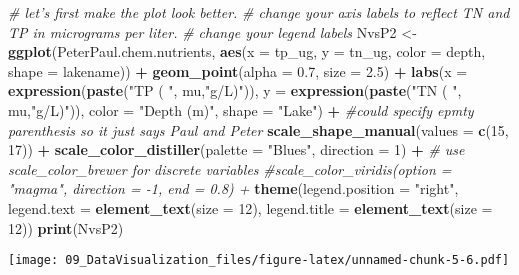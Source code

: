 \documentclass[]{article}
\newenvironment{Shaded}{\begin{snugshade}}{\end{snugshade}}
\newcommand{\KeywordTok}[1]{\textcolor[rgb]{0.13,0.29,0.53}{\textbf{#1}}}
\newcommand{\DataTypeTok}[1]{\textcolor[rgb]{0.13,0.29,0.53}{#1}}
\newcommand{\DecValTok}[1]{\textcolor[rgb]{0.00,0.00,0.81}{#1}}
\newcommand{\FloatTok}[1]{\textcolor[rgb]{0.00,0.00,0.81}{#1}}
\newcommand{\StringTok}[1]{\textcolor[rgb]{0.31,0.60,0.02}{#1}}
\newcommand{\CommentTok}[1]{\textcolor[rgb]{0.56,0.35,0.01}{\textit{#1}}}
\newcommand{\OperatorTok}[1]{\textcolor[rgb]{0.81,0.36,0.00}{\textbf{#1}}}
\newcommand{\NormalTok}[1]{#1}
\begin{document}
\begin{Shaded}
\begin{Highlighting}[]
\CommentTok{# let's first make the plot look better.}
\CommentTok{# change your axis labels to reflect TN and TP in micrograms per liter.}
\CommentTok{# change your legend labels}
\NormalTok{NvsP2 <-}
\StringTok{  }\KeywordTok{ggplot}\NormalTok{(PeterPaul.chem.nutrients, }\KeywordTok{aes}\NormalTok{(}\DataTypeTok{x =}\NormalTok{ tp_ug, }\DataTypeTok{y =}\NormalTok{ tn_ug, }\DataTypeTok{color =}\NormalTok{ depth, }\DataTypeTok{shape =}\NormalTok{ lakename)) }\OperatorTok{+}
\StringTok{  }\KeywordTok{geom_point}\NormalTok{(}\DataTypeTok{alpha =} \FloatTok{0.7}\NormalTok{, }\DataTypeTok{size =} \FloatTok{2.5}\NormalTok{) }\OperatorTok{+}
\StringTok{  }\KeywordTok{labs}\NormalTok{(}\DataTypeTok{x =} \KeywordTok{expression}\NormalTok{(}\KeywordTok{paste}\NormalTok{(}\StringTok{"TP ( "}\NormalTok{, mu,}\StringTok{"g/L)"}\NormalTok{)),}
       \DataTypeTok{y =} \KeywordTok{expression}\NormalTok{(}\KeywordTok{paste}\NormalTok{(}\StringTok{"TN ( "}\NormalTok{, mu,}\StringTok{"g/L)"}\NormalTok{)),}
       \DataTypeTok{color =} \StringTok{"Depth (m)"}\NormalTok{, }\DataTypeTok{shape =} \StringTok{"Lake"}\NormalTok{) }\OperatorTok{+}\StringTok{ }\CommentTok{#could specify epmty parenthesis so it just says Paul and Peter}
\StringTok{  }\KeywordTok{scale_shape_manual}\NormalTok{(}\DataTypeTok{values =} \KeywordTok{c}\NormalTok{(}\DecValTok{15}\NormalTok{, }\DecValTok{17}\NormalTok{)) }\OperatorTok{+}
\StringTok{  }\KeywordTok{scale_color_distiller}\NormalTok{(}\DataTypeTok{palette =} \StringTok{"Blues"}\NormalTok{, }\DataTypeTok{direction =} \DecValTok{1}\NormalTok{) }\OperatorTok{+}\StringTok{ }\CommentTok{# use scale_color_brewer for discrete variables}
\StringTok{  }\CommentTok{#scale_color_viridis(option = "magma", direction = -1, end = 0.8) +}
\StringTok{  }\KeywordTok{theme}\NormalTok{(}\DataTypeTok{legend.position =} \StringTok{"right"}\NormalTok{, }
        \DataTypeTok{legend.text =} \KeywordTok{element_text}\NormalTok{(}\DataTypeTok{size =} \DecValTok{12}\NormalTok{), }\DataTypeTok{legend.title =} \KeywordTok{element_text}\NormalTok{(}\DataTypeTok{size =} \DecValTok{12}\NormalTok{))}
\KeywordTok{print}\NormalTok{(NvsP2)}
\end{Highlighting}
\end{Shaded}

\texttt{[image: 09\_DataVisualization\_files/figure-latex/unnamed-chunk-5-6.pdf]}
\end{document}
